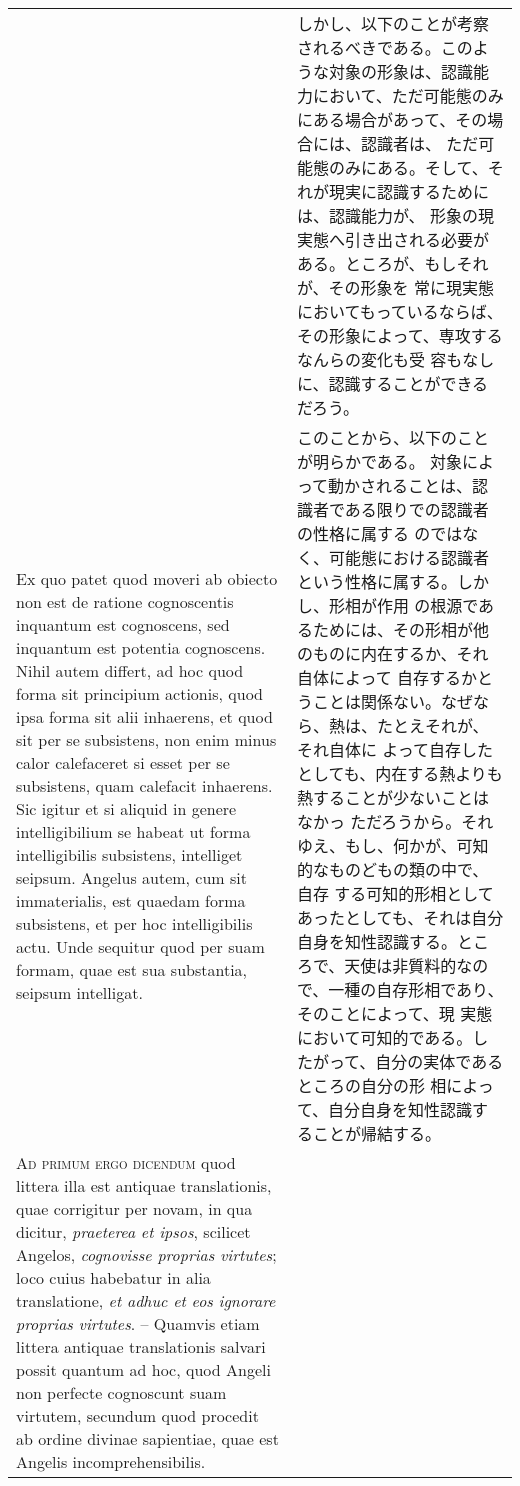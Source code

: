 \documentclass[10pt]{jsarticle} %
\begin{document}
\begin{longtable}{p{21em}p{21em}}
&

しかし、以下のことが考察されるべきである。このような対象の形象は、認識能
 力において、ただ可能態のみにある場合があって、その場合には、認識者は、
 ただ可能態のみにある。そして、それが現実に認識するためには、認識能力が、
 形象の現実態へ引き出される必要がある。ところが、もしそれが、その形象を
 常に現実態においてもっているならば、その形象によって、専攻するなんらの変化も受
 容もなしに、認識することができるだろう。

 
 \\
 
 Ex quo patet quod
moveri ab obiecto non est de ratione cognoscentis inquantum est
cognoscens, sed inquantum est potentia cognoscens. Nihil autem differt,
ad hoc quod forma sit principium actionis, quod ipsa forma sit alii
inhaerens, et quod sit per se subsistens, non enim minus calor
calefaceret si esset per se subsistens, quam calefacit inhaerens. Sic
igitur et si aliquid in genere intelligibilium se habeat ut forma
intelligibilis subsistens, intelliget seipsum. Angelus autem, cum sit
immaterialis, est quaedam forma subsistens, et per hoc intelligibilis
actu. Unde sequitur quod per suam formam, quae est sua substantia,
seipsum intelligat.


&

 このことから、以下のことが明らかである。
 対象によって動かされることは、認識者である限りでの認識者の性格に属する
 のではなく、可能態における認識者という性格に属する。しかし、形相が作用
 の根源であるためには、その形相が他のものに内在するか、それ自体によって
 自存するかとうことは関係ない。なぜなら、熱は、たとえそれが、それ自体に
 よって自存したとしても、内在する熱よりも熱することが少ないことはなかっ
 ただろうから。それゆえ、もし、何かが、可知的なものどもの類の中で、自存
 する可知的形相としてあったとしても、それは自分自身を知性認識する。とこ
 ろで、天使は非質料的なので、一種の自存形相であり、そのことによって、現
 実態において可知的である。したがって、自分の実体であるところの自分の形
 相によって、自分自身を知性認識することが帰結する。
 
\\


{\scshape Ad primum ergo dicendum} quod littera illa est
antiquae translationis, quae corrigitur per novam, in qua dicitur,
{\itshape praeterea et ipsos}, scilicet Angelos, {\itshape cognovisse proprias virtutes}; loco
cuius habebatur in alia translatione, {\itshape et adhuc et eos ignorare proprias
virtutes}. -- Quamvis etiam littera antiquae translationis salvari possit
quantum ad hoc, quod Angeli non perfecte cognoscunt suam virtutem,
secundum quod procedit ab ordine divinae sapientiae, quae est Angelis
incomprehensibilis.



\end{longtable}
\end{document}
